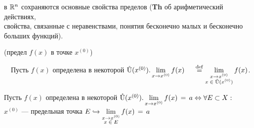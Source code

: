 \parbox[t]{0.95\linewidth}{\Note в $\R^n$ сохраняются основные свойства пределов (\textbf{Th} об арифметический действиях, \\ свойства, связанные с неравенствами, понятия бесконечно малых и бесконечно больших функций).}

\Def (предел $f(x)$ в точке $x^{(0)}$)

~~Пусть $f(x)$ определена в некоторой $\Uo(x^{(0)}). \lim\limits_{x \to x^{(0)}} f(x) \ \ \ \ \eqdef 
\lim\limits_{\substack {x \to x^{(0)} \\ x \; \in \; \Uo(x^{(0)}) }} f(x)$.


\newpage

\Th{} \parbox[t]{0.95\linewidth}{ Пусть $f(x)$ определена в некоторой $\Uo(x^{(0)}).  \lim\limits_{x \to x^{(0)}} f(x) \eq a \Leftrightarrow \forall E \subset X : $ \\
$x^{(0)}$ --- предельная точка $E \holds \lim\limits_{\substack {x \to x^{(0)} \\ x \; \in \; E }} f(x) \eq a$ }








































 











